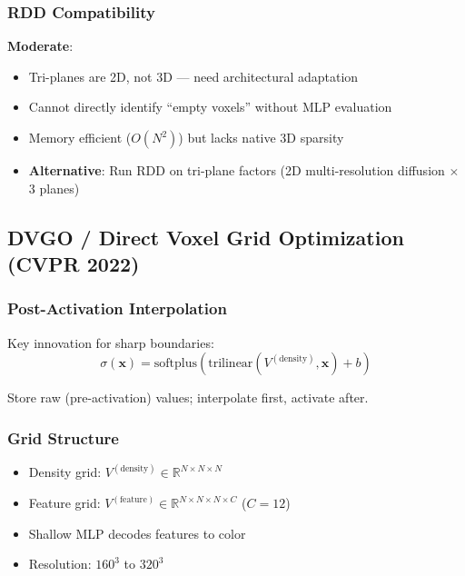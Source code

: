 \documentclass[11pt, a4paper]{article}
\begin{document}
\subsubsection{RDD Compatibility}

\textbf{Moderate}:
\begin{itemize}
    \item Tri-planes are 2D, not 3D --- need architectural adaptation
    \item Cannot directly identify ``empty voxels'' without MLP evaluation
    \item Memory efficient ($O(N^2)$) but lacks native 3D sparsity
    \item \textbf{Alternative}: Run RDD on tri-plane factors (2D multi-resolution diffusion $\times$ 3 planes)
\end{itemize}

\subsection{DVGO / Direct Voxel Grid Optimization (CVPR 2022)}

\subsubsection{Post-Activation Interpolation}

Key innovation for sharp boundaries:
\begin{equation}
    \sigma(\mathbf{x}) = \text{softplus}\left(\text{trilinear}(V^{(\text{density})}, \mathbf{x}) + b\right)
\end{equation}

Store raw (pre-activation) values; interpolate first, activate after.

\subsubsection{Grid Structure}

\begin{itemize}
    \item Density grid: $V^{(\text{density})} \in \mathbb{R}^{N \times N \times N}$
    \item Feature grid: $V^{(\text{feature})} \in \mathbb{R}^{N \times N \times N \times C}$ ($C=12$)
    \item Shallow MLP decodes features to color
    \item Resolution: $160^3$ to $320^3$
\end{itemize}
\end{document}
